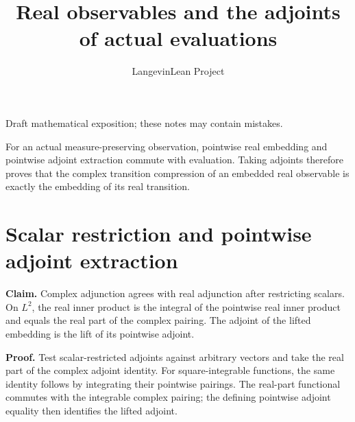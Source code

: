 \documentclass[11pt,a4paper]{article}
\title{\texorpdfstring{Real observables and the adjoints of actual evaluations}{Real observables and the adjoints of actual evaluations}}
\author{LangevinLean Project}
\date{}
\begin{document}
\maketitle
Draft mathematical exposition; these notes may contain mistakes.


For an actual measure-preserving observation, pointwise real embedding and pointwise adjoint extraction commute with evaluation. Taking adjoints therefore proves that the complex transition compression of an embedded real observable is exactly the embedding of its real transition.


\section{\texorpdfstring{Scalar restriction and pointwise adjoint extraction}{Scalar restriction and pointwise adjoint extraction}}


\textbf{Claim.} Complex adjunction agrees with real adjunction after restricting scalars. On \(L^2\), the real inner product is the integral of the pointwise real inner product and equals the real part of the complex pairing. The adjoint of the lifted embedding is the lift of its pointwise adjoint.



\textbf{Proof.} Test scalar-restricted adjoints against arbitrary vectors and take the real part of the complex adjoint identity. For square-integrable functions, the same identity follows by integrating their pointwise pairings. The real-part functional commutes with the integrable complex pairing; the defining pointwise adjoint equality then identifies the lifted adjoint.
\end{document}
